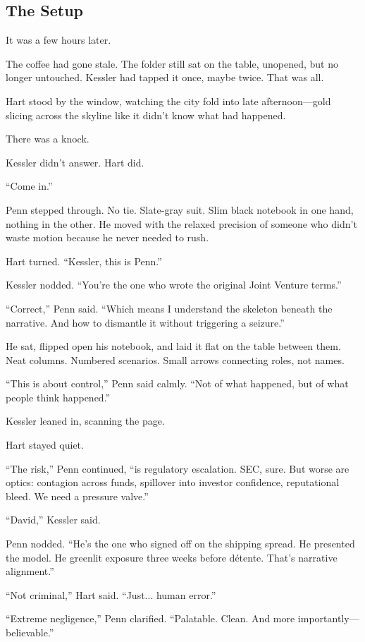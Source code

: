 
\subsection{The Setup}

It was a few hours later.

The coffee had gone stale. The folder still sat on the table, unopened, but no longer untouched. 
Kessler had tapped it once, maybe twice. That was all.

Hart stood by the window, watching the city fold into late afternoon—gold slicing across the 
skyline like it didn’t know what had happened.

There was a knock.

Kessler didn’t answer. Hart did.

“Come in.”

Penn stepped through. No tie. Slate-gray suit. Slim black notebook in one hand, nothing in the 
other. He moved with the relaxed precision of someone who didn’t waste motion because he never 
needed to rush.

Hart turned. “Kessler, this is Penn.”

Kessler nodded. “You’re the one who wrote the original Joint Venture terms.”

“Correct,” Penn said. “Which means I understand the skeleton beneath the narrative. And how to 
dismantle it without triggering a seizure.”

He sat, flipped open his notebook, and laid it flat on the table between them. 
Neat columns. Numbered scenarios. Small arrows connecting roles, not names.

“This is about control,” Penn said calmly. “Not of what happened, but of what people think happened.”

Kessler leaned in, scanning the page.

Hart stayed quiet.

“The risk,” Penn continued, “is regulatory escalation. SEC, sure. But worse are optics: 
contagion across funds, spillover into investor confidence, reputational bleed. We need a pressure valve.”

“David,” Kessler said.

Penn nodded. “He’s the one who signed off on the shipping spread. He presented the model. 
He greenlit exposure three weeks before détente. That’s narrative alignment.”

“Not criminal,” Hart said. “Just... human error.”

“Extreme negligence,” Penn clarified. “Palatable. Clean. And more importantly—believable.”

